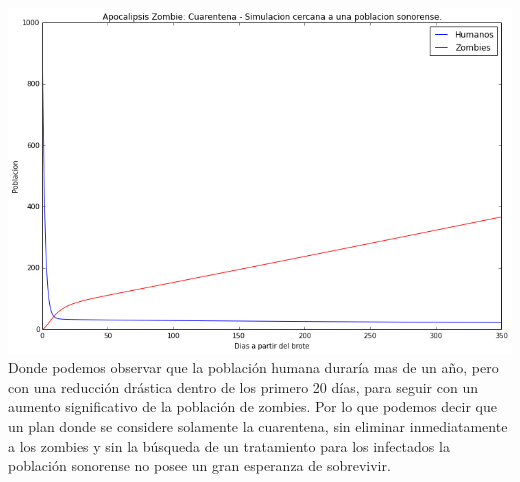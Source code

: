 \documentclass[12pt]{article}
\begin{document}
\includegraphics[scale=0.5]{sonora.png}\\

Donde podemos observar que la población humana duraría mas de un año, pero con una reducción drástica dentro de los primero 20 días, para seguir con un aumento significativo de la población de zombies. Por lo que podemos decir que un plan donde se considere solamente la cuarentena, sin eliminar inmediatamente a los zombies y sin la búsqueda de un tratamiento para los infectados la población sonorense no posee un gran esperanza de sobrevivir.


\pagebreak
\end{document}
